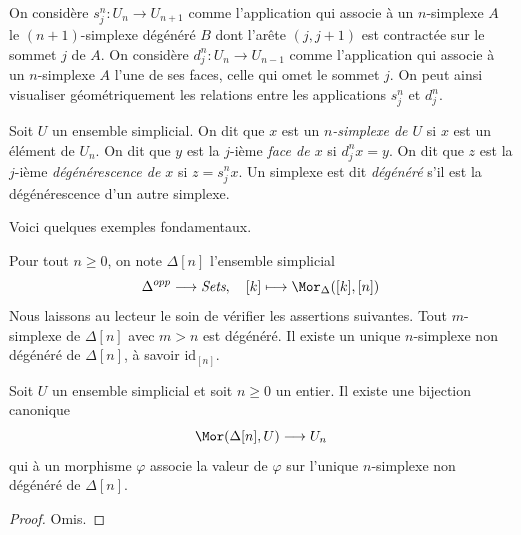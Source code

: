 \medskip\noindent
On considère $s^n_j : U_n \to U_{n + 1}$ comme l'application qui associe
à un $n$-simplexe $A$ le $(n + 1)$-simplexe dégénéré $B$ dont l'arête
$(j, j + 1)$ est contractée sur le sommet $j$ de $A$. On considère
$d^n_j : U_n \to U_{n - 1}$ comme l'application qui associe à un
$n$-simplexe $A$ l'une de ses faces, celle qui omet le sommet $j$.
On peut ainsi visualiser géométriquement les relations entre les
applications $s^n_j$ et $d^n_j$.

\begin{definition}
\label{definition-terminology-simplicial-sets}
Soit $U$ un ensemble simplicial. On dit que $x$ est un
{\it $n$-simplexe de $U$} si $x$ est un élément de $U_n$. On dit que
$y$ est la $j$-ième {\it face de $x$} si $d^n_jx = y$. On dit que
$z$ est la $j$-ième {\it dégénérescence de $x$} si $z = s^n_jx$.
Un simplexe est dit {\it dégénéré} s'il est la dégénérescence d'un autre
simplexe.
\end{definition}

\noindent
Voici quelques exemples fondamentaux.

\begin{example}
\label{example-simplex-simplicial-set}
Pour tout $n \geq 0$, on note $\Delta[n]$ l'ensemble simplicial
$$
\Delta^{opp} \longrightarrow \textit{Sets},\quad
[k] \longmapsto \Mor_{\Delta}([k], [n])
$$
Nous laissons au lecteur le soin de vérifier les assertions suivantes.
Tout $m$-simplexe de $\Delta[n]$ avec $m > n$ est dégénéré.
Il existe un unique $n$-simplexe non dégénéré de $\Delta[n]$, à savoir
$\text{id}_{[n]}$.
\end{example}

\begin{lemma}
\label{lemma-simplex-map}
Soit $U$ un ensemble simplicial et soit $n \geq 0$ un entier.
Il existe une bijection canonique
$$
\Mor(\Delta[n], U)
\longrightarrow
U_n
$$
qui à un morphisme $\varphi$ associe la valeur de $\varphi$ sur l'unique
$n$-simplexe non dégénéré de $\Delta[n]$.
\end{lemma}

\begin{proof}
Omis.
\end{proof}

